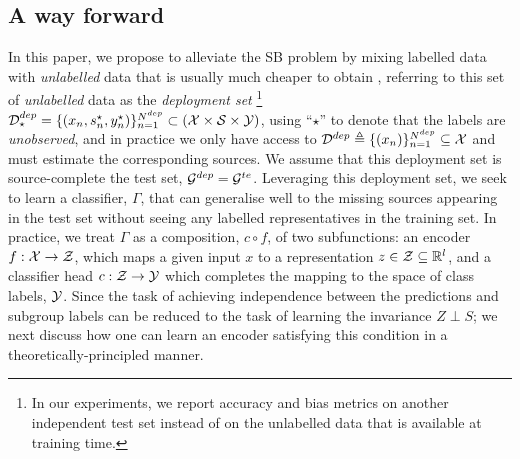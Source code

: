 \subsection{A way forward}
In this paper, we propose to alleviate the SB problem by mixing labelled data with
\emph{unlabelled} data that is usually much cheaper to obtain \citep{ChaSchZie06}, referring to
this set of \emph{unlabelled} data as the \emph{deployment set} 
%
\footnote{In our experiments, we report accuracy and bias metrics on another independent test set
instead of on the unlabelled data that is available at training time.} \( {\mathcal{D}}^{dep}_\star =\{(x_n,
s_n^\star, y_n^\star)\}_{n=1}^{N^{dep}} \subset ({\mathcal{X}} \times {\mathcal{S}} \times {\mathcal{Y}}) \), using ``\(\star\)''
to denote that the labels are \emph{unobserved}, and in practice we only have access to \(
{\mathcal{D}}^{dep} \triangleq \{(x_n)\}_{n=1}^{N^{dep}} \subseteq {\mathcal{X}} \) and must estimate the corresponding
sources.
%
We assume that this deployment set is source-complete \wrt{} the test set, \( {\mathcal{G}}^{dep} = {\mathcal{G}}^{te}
\). Leveraging this deployment set, we seek to learn a classifier, \( \Gamma \), that can
generalise well to the missing sources appearing in the test set without seeing any labelled
representatives in the training set. 
%
In practice, we treat \( \Gamma \) as a composition, \( c \circ f \), of two subfunctions: an
encoder \( f: {\mathcal{X}} \to {\mathcal{Z}} \), which maps a given input \( x \) to a representation \( z \in {\mathcal{Z}}
\subseteq \mathbb{R}^l \), and a classifier head \( c: {\mathcal{Z}} \to {\mathcal{Y}} \) which completes the mapping to the
space of class labels, \( {\mathcal{Y}} \). 
%
Since the task of achieving independence between the predictions and subgroup labels can be reduced
to the task of learning the invariance \( Z \perp S \); we next discuss how one can learn an
encoder satisfying this condition in a theoretically-principled manner.
% 
